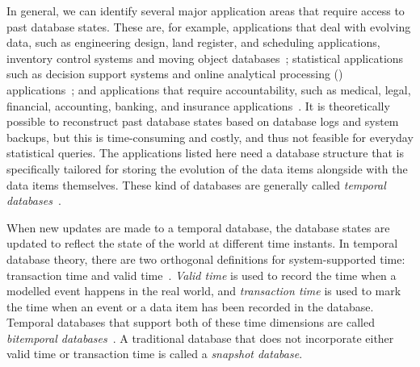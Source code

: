 In general, we can identify several major application areas
that require access to past database states. 
These are, for example, applications that deal with evolving data,
such as engineering design, land register, and scheduling applications,
inventory control systems and moving object
databases~\cite{becker:1996:mvbt,bercken:1996:multiversion,ozsoyoglu:1995:survey};
statistical applications such as decision support systems and
online analytical processing ()
applications~\cite{bercken:1996:multiversion,jensen:2001:timestamping};
and applications that require accountability, such as medical,
legal, financial, accounting, banking, and insurance
applications~\cite{jensen:2001:timestamping,lomet:1989:tsb,ozsoyoglu:1995:survey}.
It is theoretically possible to reconstruct past database states
based on database logs and system backups, but this is time-consuming
and costly, and thus not feasible for everyday statistical queries.
The applications listed here need a database structure that is
specifically tailored for storing the evolution of the data
items alongside with the data items themselves.
These kind of databases are generally called \emph{temporal
databases}~\cite{bohlen:1998:consensus}.

When new updates are made to a temporal database, the database states are
updated to reflect the state of the world at different time instants.
In temporal database theory, there are two orthogonal
definitions for system-supported time: transaction time and valid
time~\cite{bohlen:1998:consensus}.
\emph{Valid time} is used to record the time when a modelled event happens in
the real world, and \emph{transaction time} is used to mark the time when an
event or a data item has been recorded in the database. 
Temporal databases that support both of these time dimensions are
called \emph{bitemporal databases}~\cite{bohlen:1998:consensus}.
A traditional database that does not incorporate either valid time or
transaction time is called a \emph{snapshot database}.

